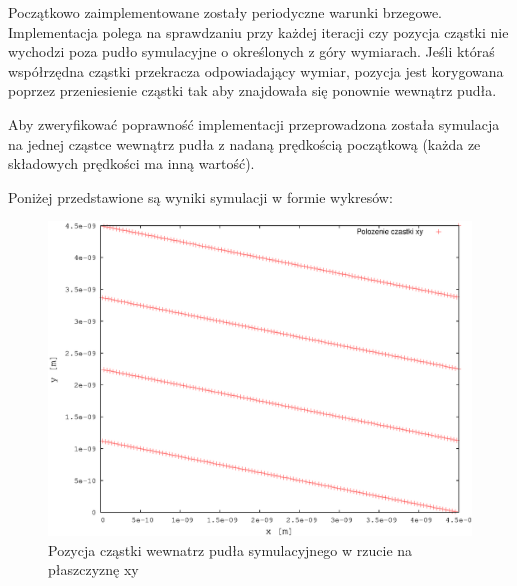 \documentclass[a4paper,10pt]{article}
\begin{document}
Początkowo zaimplementowane zostały periodyczne warunki brzegowe. Implementacja polega na sprawdzaniu przy każdej iteracji czy pozycja cząstki nie wychodzi poza pudło symulacyjne o określonych z góry wymiarach. Jeśli któraś współrzędna cząstki przekracza odpowiadający wymiar, pozycja jest korygowana poprzez przeniesienie cząstki tak aby znajdowała się ponownie wewnątrz pudła.

Aby zweryfikować poprawność implementacji przeprowadzona została symulacja na jednej cząstce wewnątrz pudła z nadaną prędkością początkową (każda ze składowych prędkości ma inną wartość).

Poniżej przedstawione są wyniki symulacji w formie wykresów:

\begin{figure}[h]
\begin{center}
\includegraphics[scale=0.6]{wyniki/one-particle-xy.eps}
\caption{Pozycja cząstki wewnatrz pudła symulacyjnego w rzucie na płaszczyznę xy}
\label{pic:one-xy}
\end{center}
\end{figure}
\FloatBarrier
\end{document}
